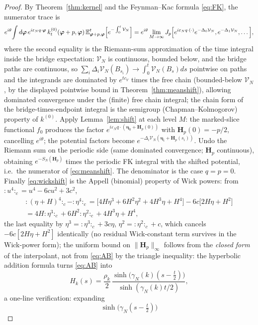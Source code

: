 \documentclass[11pt,a4paper]{article}
\theoremstyle{plain}
\theoremstyle{definition}
\newcommand{\E}{\mathbb{E}}
\newcommand{\eps}{\varepsilon}
\DeclareMathOperator{\sh}{sinh}
\begin{document}
\begin{proof}
By Theorem~\ref{thm:kernel} and the Feynman--Kac formula \eqref{eq:FK}, the
numerator trace is
\[
 e^{i\theta}\!\int d\bm\varphi\,e^{i\eps_Nq\cdot\bm\varphi}\,
 k^{(0)}_t(\bm\varphi+p,\bm\varphi)\,
 \E^t_{\bm\varphi+p,\bm\varphi}\Bigl[e^{-\int_0^t\mathcal V_N}\Bigr]
 =e^{i\theta}\lim_{M\to\infty}
 J_p\Bigl[e^{i\eps_Nq\cdot(\cdot)}e^{-\Delta_0\mathcal V_N},
 e^{-\Delta_1\mathcal V_N},\dots\Bigr],
\]
where the second equality is the Riemann-sum approximation of the time
integral inside the bridge expectation: $\mathcal V_N$ is continuous, bounded below, and
the bridge paths are continuous, so
$\sum_i\Delta_i\mathcal V_N(B_{s_i})\to\int_0^t\mathcal V_N(B_s)ds$
pointwise on paths and the integrands are dominated by $e^{tc_V}$ times the
free chain (bounded-below $\mathcal V_N$, by the displayed pointwise bound
in Theorem~\ref{thm:meanshift}), allowing
dominated convergence under the (finite) free chain integral;
the chain form of the bridge-times-endpoint integral is the semigroup
(Chapman--Kolmogorov) property of $k^{(0)}$. Apply Lemma~\ref{lem:shift} at
each level $M$: the marked-slice functional $f_0$ produces the factor
$e^{i\eps_Nq\cdot(\bm\eta_0+\bm H_p(0))}$ with
$\bm H_p(0)=-p/2$, cancelling $e^{i\theta}$; the potential factors become
$e^{-\Delta_i\mathcal V_N(\bm\eta_i+\bm H_p(s_i))}$. Undo the Riemann sum on the periodic
side (same dominated convergence; $\bm H_p$ continuous), obtaining
$e^{-S_N(\bm H_p)}$ times the periodic FK integral with the shifted potential,
i.e.\ the numerator of \eqref{eq:meanshift}. The denominator is the case
$q=p=0$. Finally \eqref{eq:wickshift} is the Appell (binomial) property of Wick
powers: from ${:}u^4{:}_c=u^4-6cu^2+3c^2$,
\begin{gather*}
 {:}(\eta+H)^4{:}_c-{:}\eta^4{:}_c
 =\bigl[4H\eta^3+6H^2\eta^2+4H^3\eta+H^4\bigr]
 -6c\bigl[2H\eta+H^2\bigr]\\
 =4H{:}\eta^3{:}_c+6H^2{:}\eta^2{:}_c+4H^3\eta+H^4,
\end{gather*}
the last equality by $\eta^3={:}\eta^3{:}_c+3c\eta$,
$\eta^2={:}\eta^2{:}_c+c$, which cancels $-6c[2H\eta+H^2]$ identically (no
residual Wick-constant term survives in the Wick-power form); the uniform bound on
$\|\bm H_p\|_\infty$ follows from the \emph{closed form} of the interpolant,
not from \eqref{eq:AB} by the triangle inequality: the hyperbolic addition
formula turns \eqref{eq:AB} into
\[
 H_k(s)=\frac{\rho_k}2\,
 \frac{\sh\bigl(\gamma_N(k)(s-\tfrac t2)\bigr)}{\sh(\gamma_N(k)t/2)},
\]
a one-line verification: expanding
\[
 \sh\bigl(\gamma_N(s-\tfrac t2)\bigr)
\]
\end{proof}
\end{document}
